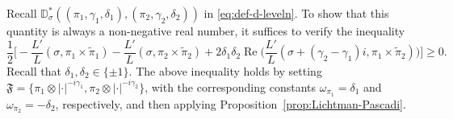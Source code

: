 \documentclass[12pt,reqno]{amsart}
\renewcommand{\tilde}{\widetilde}
\theoremstyle{remark}
\renewcommand{\tilde}{\widetilde}
\DeclareMathOperator{\Real}{Re}
\renewcommand{\tilde}{\widetilde}
\newcommand{\kp}{\mathfrak{p}}
\numberwithin{equation}{section}
\begin{document}
   
    Recall $\mathbb{D}^*_{\sigma} ((\pi_1, \gamma_1, \delta_1), (\pi_2, \gamma_2, \delta_2))$ in \eqref{eq:def-d-leveln}. To show that this quantity is always a non-negative real number, it suffices to verify the inequality
   \begin{equation*}
        \frac{1}{2}\Big[-\frac{L'}{L}(\sigma, \pi_1 \times \tilde{\pi}_1) -\frac{L'}{L}(\sigma, \pi_2 \times \tilde{\pi}_2) +2\delta_1\delta_2 \Real\Big(\frac{L'}{L}(\sigma+(\gamma_2-\gamma_1)i, \pi_1 \times \tilde{\pi}_2) \Big)\Big] \ge 0.
    \end{equation*}
    Recall that $\delta_1, \delta_2 \in \{\pm1\}$. The above inequality holds by setting $\mathfrak{F}=\{\pi_1 \otimes |\cdot|^{-i\gamma_1}, \pi_2 \otimes |\cdot|^{-i\gamma_2}\}$, with the corresponding constants $\omega_{\pi_1} = \delta_{1}$ and $\omega_{\pi_2} = -\delta_{2}$, respectively, and then applying Proposition~\ref{prop:Lichtman-Pascadi}. 
    
\end{document}
